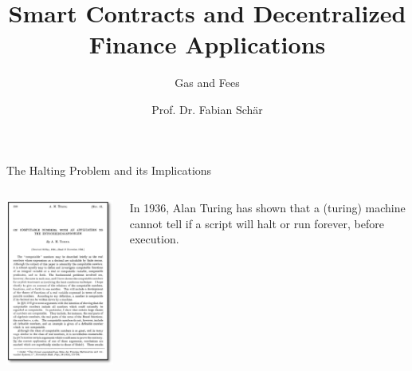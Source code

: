 \documentclass[handout]{beamer}
\title{Smart Contracts and Decentralized Finance Applications}
\subtitle{Gas and Fees}
\author{Prof. Dr. Fabian Schär}
\institute{University of Basel}
\begin{document}
\thispagestyle{empty}
\begin{frame}[noframenumbering]
	\titlepage
\end{frame}

\begin{frame}{The Halting Problem and its Implications}
\begin{columns}
	\begin{column}{0.3\textwidth}
		\center
		\includegraphics[width=\textwidth ]{../assets/images/alan-turing.png}
	\end{column}
	\begin{column}{0.7\textwidth}
		In 1936, Alan Turing has shown that a (turing) machine cannot tell if a script will halt or run forever, before execution.\\

\end{column}
\end{columns}
\end{frame}
\end{document}
